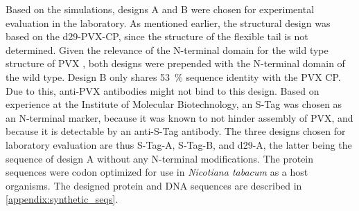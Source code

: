Based on the simulations, designs A and B were chosen for experimental evaluation in the laboratory. As mentioned earlier, the structural design was based on the d29-PVX-CP, since the structure of the flexible tail is not determined. Given the relevance of the N-terminal domain for the wild type structure of PVX \cite{del22_rigid}, both designs were prepended with the N-terminal domain of the wild type. Design B only shares \SI{53}{\percent} sequence identity with the PVX CP. Due to this, anti-PVX antibodies might not bind to this design. Based on experience at the Institute of Molecular Biotechnology, an S-Tag was chosen as an N-terminal marker, because it was known to not hinder assembly of PVX, and because it is detectable by an anti-S-Tag antibody. The three designs chosen for laboratory evaluation are thus S-Tag-A, S-Tag-B, and d29-A, the latter being the sequence of design A without any N-terminal modifications. The protein sequences were codon optimized for use in \emph{Nicotiana tabacum} as a host organisms. The designed protein and DNA sequences are described in \autoref{appendix:synthetic_seqs}.